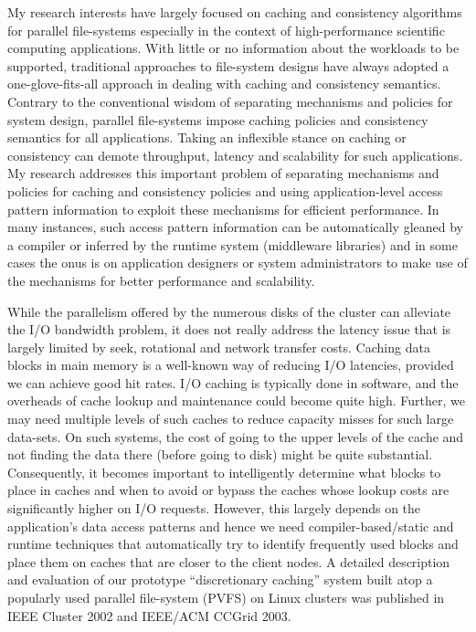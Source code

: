 \documentclass{article}
\begin{document}
My research interests have largely focused on caching and consistency
algorithms for parallel file-systems especially in the context of high-performance
scientific computing applications. With little or no information about the workloads to be supported,
traditional approaches to file-system designs have always adopted
a one-glove-fits-all approach in dealing with caching and consistency semantics.
Contrary to the conventional wisdom of separating mechanisms and policies for system
design, parallel file-systems impose caching policies and consistency semantics for all applications. 
Taking an inflexible stance on caching or consistency can demote throughput, latency and scalability
for such applications. My research addresses this important
problem of separating mechanisms and policies for caching and consistency policies
and using application-level access pattern information to exploit these mechanisms for efficient
performance. In many instances, such access pattern information can be automatically
gleaned by a compiler or inferred by the runtime system (middleware libraries) and in some
cases the onus is on application designers or system administrators to make use
of the mechanisms for better performance and scalability. 

While the parallelism 
offered by the numerous disks of the cluster can alleviate the I/O bandwidth 
problem, it does not really address the latency issue that is largely limited 
by seek, rotational and network transfer costs. Caching data blocks in main 
memory is a well-known way of reducing I/O latencies, provided we can achieve 
good hit rates. I/O caching is typically done in software, and the overheads 
of cache lookup and maintenance could become quite high. Further, we may need 
multiple levels of such caches to reduce capacity misses for such large 
data-sets. On such systems, the cost of going to the upper levels of the cache 
and not finding the data there (before going to disk) might be quite 
substantial. Consequently, it becomes important to intelligently determine what
blocks to place in caches and when to avoid or bypass the caches whose lookup 
costs are significantly higher on I/O requests. However, this largely depends 
on the application's data access patterns and hence we need compiler-based/static 
and runtime techniques that automatically try to identify frequently 
used blocks and place them on caches that are closer to the client nodes.
A detailed description and evaluation of our prototype ``discretionary caching'' system
built atop a popularly used parallel file-system (PVFS) on Linux clusters
was published in IEEE Cluster 2002 and IEEE/ACM CCGrid 2003.
\end{document}
